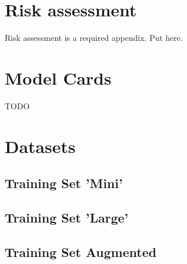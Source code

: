 \begin{uomappendix}
            
            
        
        \section{Risk assessment}
            \begin{temp}
                Risk assessment is a required appendix. Put here.
            \end{temp}
    
        \section{Model Cards}
            \begin{temp}
                TODO
            \end{temp}
    
        \section{Datasets}
    
            \subsection{Training Set 'Mini'} \label{data:mini}
    
            \subsection{Training Set 'Large'} \label{data:large}
    
            \subsection{Training Set Augmented} \label{data:aug}
    

\end{uomappendix}
